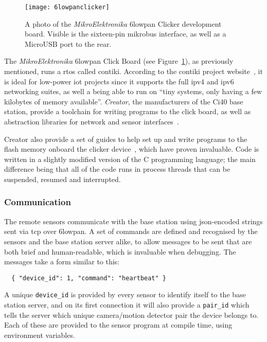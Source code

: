 \begin{figure}
  \centering
  \texttt{[image: 6lowpanclicker]}
  \caption{A photo of the \textit{MikroElektronika} \gls{6lowpan} Clicker
  development board. Visible is the sixteen-pin \gls{mikrobus} interface, as
  well as a MicroUSB port to the rear.}
  \label{fig:6lowpanclicker}
\end{figure}

The \textit{MikroElektronika} \gls{6lowpan} Click Board (see
Figure~\ref{fig:6lowpanclicker}), as previously mentioned, runs a
\acrfull{rtos} called \gls{contiki}. According to the \gls{contiki} project
website~\cite{contiki}, it is ideal for low-power \acrshort{iot} projects
since it supports the full \acrshort{ipv4} and \acrshort{ipv6} networking
suites, as well a being able to run on ``tiny systems, only having a few
kilobytes of memory available''. \textit{Creator}, the manufacturers of the
Ci40 base station, provide a toolchain for writing programs to the click
board, as well as abstraction libraries for network and sensor
interfaces~\cite{letmecreate}.

Creator also provide a set of guides to help set up and write programs to the
flash memory onboard the clicker device~\cite{clickersetupguide}, which have
proven invaluable. Code is written in a slightly modified version of the C
programming language; the main difference being that all of the code runs in
process threads that can be suspended, resumed and interrupted.

\subsubsection{Communication}
The remote sensors communicate with the base station using
\acrshort{json}-encoded strings sent via \acrshort{tcp} over \gls{6lowpan}. A
set of commands are defined and recognised by the sensors and the base
station server alike, to allow messages to be sent that are both brief and
human-readable, which is invaluable when debugging. The messages take a form similar to this:

\begin{verbatim}
  { "device_id": 1, "command": "heartbeat" }
\end{verbatim}

A unique \texttt{device\_id} is provided by every sensor to identify itself
to the base station server, and on its first connection it will also provide
a \texttt{pair\_id} which tells the server which unique camera/motion
detector pair the device belongs to. Each of these are provided to the sensor
program at compile time, using environment variables.

